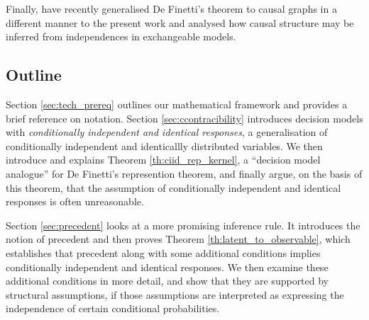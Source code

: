 \documentclass{article}
\begin{document}
Finally, \citet{guoCausalFinettiIdentification2022} have recently generalised De Finetti's theorem to causal graphs in a different manner to the present work and analysed how causal structure may be inferred from independences in exchangeable models.

\subsection{Outline}

Section \ref{sec:tech_prereq} outlines our mathematical framework and provides a brief reference on notation. Section \ref{sec:ccontracibility} introduces decision models with \emph{conditionally independent and identical responses}, a generalisation of conditionally independent and identicallly distributed variables. We then introduce and explains Theorem \ref{th:ciid_rep_kernel}, a ``decision model analogue'' for De Finetti's represention theorem, and finally argue, on the basis of this theorem, that the assumption of conditionally independent and identical responses is often unreasonable.

Section \ref{sec:precedent} looks at a more promising inference rule. It introduces the notion of precedent and then proves Theorem \ref{th:latent_to_observable}, which establishes that precedent along with some additional conditions implies conditionally independent and identical responses. We then examine these additional conditions in more detail, and show that they are supported by structural assumptions, if those assumptions are interpreted as expressing the independence of certain conditional probabilities.









\appendix


\end{document}
